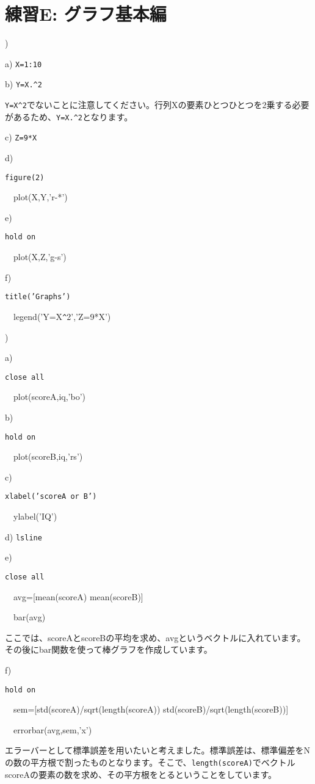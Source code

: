\documentclass{jsarticle}
\begin{document}
\bigskip

\section{練習E: グラフ基本編}

)

a) {\tt X=1:10}

b) {\tt Y=X.\verb|^|2}

\begin{screen}
{\tt Y=X\verb|^|2}でないことに注意してください。行列Xの要素ひとつひとつを2乗する必要があるため、{\tt Y=X.\verb|^|2}となります。
\end{screen}

c) {\tt Z=9*X}

d) {\tt figure(2)

\ \ plot(X,Y,'r-*')}

e) {\tt hold on

\ \ plot(X,Z,'g-s')}

f) {\tt title('Graphs')

\ \ legend('Y=X\verb|^|2','Z=9*X')
}

\bigskip

)

a) {\tt close all

\ \ plot(scoreA,iq,'bo')}

b) {\tt hold on

\ \ plot(scoreB,iq,'rs')}

c) {\tt xlabel('scoreA or B')

\ \ ylabel('IQ')}

d) {\tt lsline}

e) {\tt close all

\ \ avg=[mean(scoreA) mean(scoreB)]

\ \ bar(avg)}

\begin{screen}
ここでは、scoreAとscoreBの平均を求め、avgというベクトルに入れています。
その後にbar関数を使って棒グラフを作成しています。
\end{screen}

f) {\tt hold on

\ \ sem=[std(scoreA)/sqrt(length(scoreA)) std(scoreB)/sqrt(length(scoreB))]

\ \ errorbar(avg,sem,'x')}

\begin{screen}
エラーバーとして標準誤差を用いたいと考えました。標準誤差は、標準偏差をNの数の平方根で割ったものとなります。そこで、{\tt length(scoreA)}でベクトルscoreAの要素の数を求め、その平方根をとるということをしています。
\end{screen}
\end{document}
